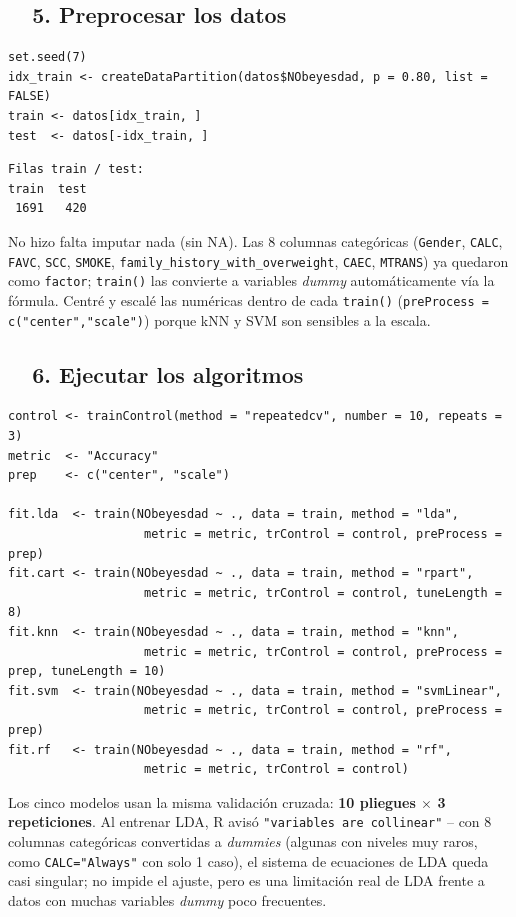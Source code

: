 \documentclass[11pt,a4paper]{article}
\begin{document}
\subsection{\faTools\ \ 5. Preprocesar los datos}
\begin{lstlisting}[style=styleR]
set.seed(7)
idx_train <- createDataPartition(datos$NObeyesdad, p = 0.80, list = FALSE)
train <- datos[idx_train, ]
test  <- datos[-idx_train, ]
\end{lstlisting}
\begin{lstlisting}[style=styleOut]
Filas train / test:
train  test
 1691   420
\end{lstlisting}
No hizo falta imputar nada (sin NA). Las 8 columnas categóricas (\texttt{Gender}, \texttt{CALC}, \texttt{FAVC}, \texttt{SCC}, \texttt{SMOKE}, \texttt{family\_history\_with\_overweight}, \texttt{CAEC}, \texttt{MTRANS}) ya quedaron como \texttt{factor}; \texttt{train()} las convierte a variables \textit{dummy} automáticamente vía la fórmula. Centré y escalé las numéricas dentro de cada \texttt{train()} (\texttt{preProcess = c("center","scale")}) porque kNN y SVM son sensibles a la escala.

\subsection{\faPlay\ \ 6. Ejecutar los algoritmos}
\begin{lstlisting}[style=styleR]
control <- trainControl(method = "repeatedcv", number = 10, repeats = 3)
metric  <- "Accuracy"
prep    <- c("center", "scale")

fit.lda  <- train(NObeyesdad ~ ., data = train, method = "lda",
                   metric = metric, trControl = control, preProcess = prep)
fit.cart <- train(NObeyesdad ~ ., data = train, method = "rpart",
                   metric = metric, trControl = control, tuneLength = 8)
fit.knn  <- train(NObeyesdad ~ ., data = train, method = "knn",
                   metric = metric, trControl = control, preProcess = prep, tuneLength = 10)
fit.svm  <- train(NObeyesdad ~ ., data = train, method = "svmLinear",
                   metric = metric, trControl = control, preProcess = prep)
fit.rf   <- train(NObeyesdad ~ ., data = train, method = "rf",
                   metric = metric, trControl = control)
\end{lstlisting}
Los cinco modelos usan la misma validación cruzada: \textbf{10 pliegues $\times$ 3 repeticiones}. Al entrenar LDA, R avisó \texttt{"variables are collinear"} -- con 8 columnas categóricas convertidas a \textit{dummies} (algunas con niveles muy raros, como \texttt{CALC="Always"} con solo 1 caso), el sistema de ecuaciones de LDA queda casi singular; no impide el ajuste, pero es una limitación real de LDA frente a datos con muchas variables \textit{dummy} poco frecuentes.
\end{document}
